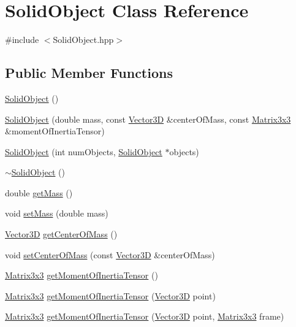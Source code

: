 \hypertarget{class_solid_object}{\section{Solid\-Object Class Reference}
\label{class_solid_object}
}


{\ttfamily \#include $<$Solid\-Object.\-hpp$>$}

\subsection*{Public Member Functions}
\begin{DoxyCompactItemize}
\item 
\hyperlink{class_solid_object_a4737808f5d6f84499e2a292cc08ce125}{Solid\-Object} ()
\item 
\hyperlink{class_solid_object_adff5837bdc982a7f20c3c0b1c3cef59c}{Solid\-Object} (double mass, const \hyperlink{class_vector3_d}{Vector3\-D} \&center\-Of\-Mass, const \hyperlink{class_matrix3x3}{Matrix3x3} \&moment\-Of\-Inertia\-Tensor)
\item 
\hyperlink{class_solid_object_ac828e5525505c81236a9b039d92c6a6b}{Solid\-Object} (int num\-Objects, \hyperlink{class_solid_object}{Solid\-Object} $\ast$objects)
\item 
\hyperlink{class_solid_object_a78b7c6dec129da027e767eb5d6303f6e}{$\sim$\-Solid\-Object} ()
\item 
double \hyperlink{class_solid_object_a54588eefe4a8034b6fadb4f68f4f5c16}{get\-Mass} ()
\item 
void \hyperlink{class_solid_object_a5c9e38e7f660ef708d91b40ce5d81bbd}{set\-Mass} (double mass)
\item 
\hyperlink{class_vector3_d}{Vector3\-D} \hyperlink{class_solid_object_a74a30608d1b46f092250ac2ebc37d1cf}{get\-Center\-Of\-Mass} ()
\item 
void \hyperlink{class_solid_object_a7e90b855ba306091dc31ccf4c2f8a2d6}{set\-Center\-Of\-Mass} (const \hyperlink{class_vector3_d}{Vector3\-D} \&center\-Of\-Mass)
\item 
\hyperlink{class_matrix3x3}{Matrix3x3} \hyperlink{class_solid_object_aad5a818b21478d8990eea0a8a66fd8e2}{get\-Moment\-Of\-Inertia\-Tensor} ()
\item 
\hyperlink{class_matrix3x3}{Matrix3x3} \hyperlink{class_solid_object_a5da9fcce2f2bf4348f69afc50e3382a4}{get\-Moment\-Of\-Inertia\-Tensor} (\hyperlink{class_vector3_d}{Vector3\-D} point)
\item 
\hyperlink{class_matrix3x3}{Matrix3x3} \hyperlink{class_solid_object_a2b538281c05bea601cc88c83c6f29e61}{get\-Moment\-Of\-Inertia\-Tensor} (\hyperlink{class_vector3_d}{Vector3\-D} point, \hyperlink{class_matrix3x3}{Matrix3x3} frame)

\end{DoxyCompactItemize}
